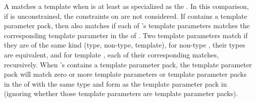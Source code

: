 \pnum
A  matches a template
  when
 is at least as specialized as the  .
In this comparison, if  is unconstrained,
the constraints on  are not considered.
If  contains a template parameter pack, then  also matches 
if each of 's template parameters
matches the corresponding template parameter in the
 of .
Two template parameters match if they are of the same kind (type, non-type, template),
for non-type , their types are
equivalent, and for template ,
each of their corresponding  matches, recursively.
When 's  contains a template parameter
pack, the template parameter pack will match zero or more template
parameters or template parameter packs in the  of
 with the same type and form as the template parameter pack in 
(ignoring whether those template parameters are template parameter packs).

